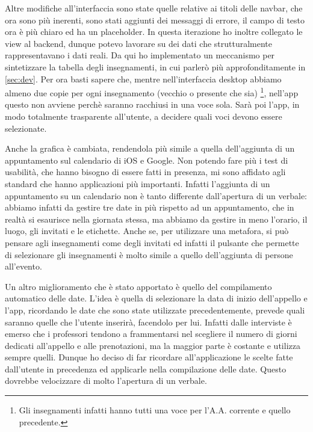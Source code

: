 \documentclass[Lau, oneside]{sapthesis}%
\begin{document}
Altre modifiche all'interfaccia sono state quelle relative ai titoli delle navbar, che ora sono più inerenti, sono stati aggiunti dei messaggi di errore, il campo di testo ora è più chiaro ed ha un placeholder. In questa iterazione ho inoltre collegato le view al backend, dunque potevo lavorare su dei dati che strutturalmente rappresentavano i dati reali. Da qui ho implementato un meccanismo per sintetizzare la tabella degli insegnamenti, in cui parlerò più approfonditamente in \ref{sec:dev}. Per ora basti sapere che, mentre nell'interfaccia desktop abbiamo almeno due copie per ogni insegnamento (vecchio o presente che sia) \footnote{Gli insegnamenti infatti hanno tutti una voce per l'A.A. corrente e quello precedente.}, nell'app questo non avviene perchè saranno racchiusi in una voce sola. Sarà poi l'app, in modo totalmente trasparente all'utente, a decidere quali voci devono essere selezionate.

Anche la grafica è cambiata, rendendola più simile a quella dell'aggiunta di un appuntamento sul calendario di iOS e Google. Non potendo fare più i test di usabilità, che hanno bisogno di essere fatti in presenza, mi sono affidato agli standard che hanno applicazioni più importanti. Infatti l'aggiunta di un appuntamento su un calendario non è tanto differente dall'apertura di un verbale: abbiamo infatti da gestire tre date in più rispetto ad un appuntamento, che in realtà si esaurisce nella giornata stessa, ma abbiamo da gestire in meno l'orario, il luogo, gli invitati e le etichette. Anche se, per utilizzare una metafora, si può pensare agli insegnamenti come degli invitati ed infatti il pulsante che permette di selezionare gli insegnamenti è molto simile a quello dell'aggiunta di persone all'evento.

Un altro miglioramento che è stato apportato è quello del compilamento automatico delle date. L'idea è quella di selezionare la data di inizio dell'appello e l'app, ricordando le date che sono state utilizzate precedentemente, prevede quali saranno quelle che l'utente inserirà, facendolo per lui. Infatti dalle interviste è emerso che i professori tendono a frammentarsi nel scegliere il numero di giorni dedicati all'appello e alle prenotazioni, ma la maggior parte è costante e utilizza sempre quelli. Dunque ho deciso di far ricordare all'applicazione le scelte fatte dall'utente in precedenza ed applicarle nella compilazione delle date.
Questo dovrebbe velocizzare di molto l'apertura di un verbale. %
\end{document}
